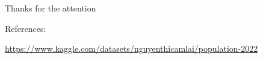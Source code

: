 \documentclass[
	11pt, %
]{beamer}
\begin{document}
\begin{frame}[plain] %
	\begin{center}
		{\Huge Thanks for the attention}
		
		\bigskip\bigskip %
		
		{\LARGE References:}
		
		\bigskip
		\small

		\url{https://www.kaggle.com/datasets/nguyenthicamlai/population-2022}

	\end{center}
\end{frame}




	
	
	
	
	
\end{document}
